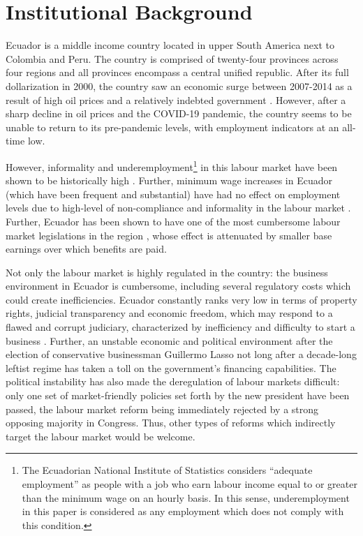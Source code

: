\documentclass[11pt,a4paper]{article}\usepackage[]{graphicx}\usepackage[]{xcolor}
\begin{document}
\section{Institutional Background}

Ecuador is a middle income country located in upper South America next to Colombia and Peru. The country is comprised of twenty-four provinces across four regions and all provinces encompass a central unified republic. After its full dollarization in 2000, the country saw an economic surge between 2007-2014 as a result of high oil prices and a relatively indebted government \parencite{Weisbrot.2017}. However, after a sharp decline in oil prices and the COVID-19 pandemic, the country seems to be unable to return to its pre-pandemic levels, with employment indicators at an all-time low. 

However, informality and underemployment\footnote{The Ecuadorian National Institute of Statistics considers ``adequate employment'' as people with a job who earn labour income equal to or greater than the minimum wage on an hourly basis. In this sense, underemployment in this paper is considered as any employment which does not comply with this condition.} in this labour market have been shown to be historically high \parencite{Meneses.2021, Chavez.2012, Mendoza.2020}. Further, minimum wage increases in Ecuador (which have been frequent and substantial) have had no effect on employment levels due to high-level of non-compliance and informality in the labour market \parencite{Canelas.2014}. Further, Ecuador has been shown to have one of the most cumbersome labour market legislations in the region \parencite{MacIsaac.1997}, whose effect is attenuated by smaller base earnings over which benefits are paid.

Not only the labour market is highly regulated in the country: the business environment in Ecuador is cumbersome, including several regulatory costs which could create inefficiencies. Ecuador constantly ranks very low in terms of property rights, judicial transparency and economic freedom, which may respond to a flawed and corrupt judiciary, characterized by inefficiency and difficulty to start a business \textcite{Euromonitor.2022}. Further, an unstable economic and political environment after the election of conservative businessman Guillermo Lasso not long after a decade-long leftist regime has taken a toll on the government's financing capabilities. The political instability has also made the deregulation of labour markets difficult: only one set of market-friendly policies set forth by the new president have been passed, the labour market reform being immediately rejected by a strong opposing majority in Congress. Thus, other types of reforms which indirectly target the labour market would be welcome. 
\end{document}
